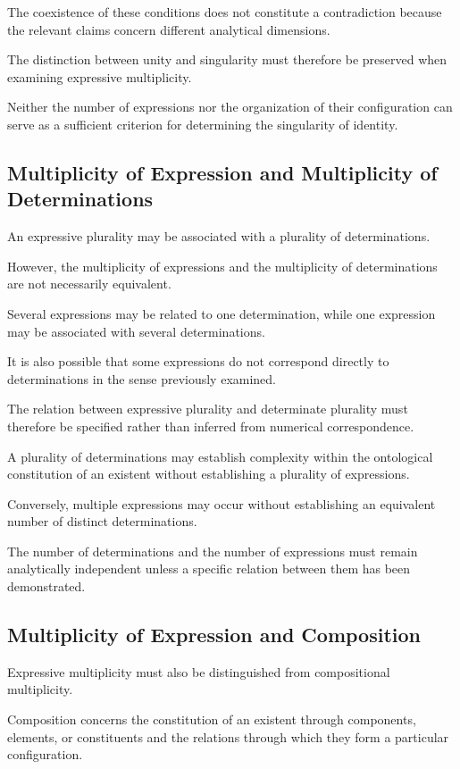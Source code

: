 The coexistence of these conditions does
not constitute a contradiction because
the relevant claims concern different
analytical dimensions.

The distinction between unity and singularity
must therefore be preserved when examining
expressive multiplicity.

Neither the number of expressions nor the
organization of their configuration can
serve as a sufficient criterion for determining
the singularity of identity.

\subsection{Multiplicity of Expression and Multiplicity of Determinations}

An expressive plurality may be associated
with a plurality of determinations.

However, the multiplicity of expressions
and the multiplicity of determinations are
not necessarily equivalent.

Several expressions may be related to one
determination, while one expression may be
associated with several determinations.

It is also possible that some expressions
do not correspond directly to determinations
in the sense previously examined.

The relation between expressive plurality
and determinate plurality must therefore
be specified rather than inferred from
numerical correspondence.

A plurality of determinations may establish
complexity within the ontological constitution
of an existent without establishing a plurality
of expressions.

Conversely, multiple expressions may occur
without establishing an equivalent number
of distinct determinations.

The number of determinations and the number
of expressions must remain analytically
independent unless a specific relation
between them has been demonstrated.

\subsection{Multiplicity of Expression and Composition}

Expressive multiplicity must also be distinguished
from compositional multiplicity.

Composition concerns the constitution of an
existent through components, elements, or
constituents and the relations through which
they form a particular configuration.

